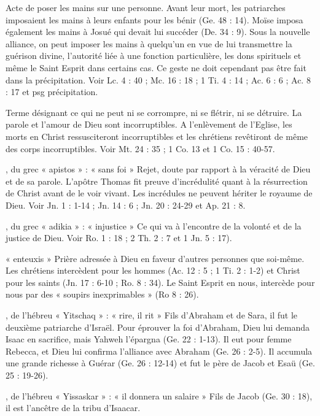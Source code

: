 \begin{multicols}{2}
Acte de poser les mains sur une personne. Avant leur mort, les patriarches imposaient les mains à leurs enfants pour les bénir (Ge. 48 : 14). Moïse imposa également les mains à Josué qui devait lui succéder (De. 34 : 9). Sous la nouvelle alliance, on peut imposer les mains à quelqu’un en vue de lui transmettre la guérison divine, l’autorité liée à une fonction particulière, les dons spirituels et même le Saint Esprit dans certains cas. Ce geste ne doit cependant pas être fait dans la précipitation. Voir Lc. 4 : 40 ; Mc. 16 : 18 ; 1 Ti. 4 : 14 ; Ac. 6 : 6 ; Ac. 8 : 17 et psg précipitation.

Terme désignant ce qui ne peut ni se corrompre, ni se flétrir, ni se détruire. La parole et l’amour de Dieu sont incorruptibles. A l'enlèvement de l'Eglise, les morts en Christ ressusciteront incorruptibles et les chrétiens revêtiront de même des corps incorruptibles. Voir Mt. 24 : 35 ; 1 Co. 13 et 1 Co. 15 : 40-57.


, du grec « apistos » : « sans foi »
Rejet, doute par rapport à la véracité de Dieu et de sa parole. L'apôtre Thomas fit preuve d’incrédulité quant à la résurrection de Christ avant de le voir vivant. Les incrédules ne peuvent hériter le royaume de Dieu. Voir Jn. 1 : 1-14 ; Jn. 14 : 6 ; Jn. 20 : 24-29 et Ap. 21 : 8.


, du grec « adikia » : « injustice »
Ce qui va à l'encontre de la volonté et de la justice de Dieu. Voir Ro. 1 : 18 ; 2 Th. 2 : 7 et 1 Jn. 5 : 17).


« enteuxis »
Prière adressée à Dieu en faveur d'autres personnes que soi-même. Les chrétiens intercèdent pour les hommes (Ac. 12 : 5 ; 1 Ti. 2 : 1-2) et Christ pour les saints (Jn. 17 : 6-10 ; Ro. 8 : 34). Le Saint Esprit en nous, intercède pour nous par des « soupirs inexprimables » (Ro 8 : 26).


, de l'hébreu « Yitschaq » : « rire, il rit »
Fils d'Abraham et de Sara, il fut le deuxième patriarche d'Israël.
Pour éprouver la foi d'Abraham, Dieu lui demanda Isaac en sacrifice, mais Yahweh l'épargna (Ge. 22 : 1-13). Il eut pour femme Rebecca, et Dieu lui confirma l'alliance avec Abraham (Ge. 26 : 2-5). Il accumula une grande richesse à Guérar (Ge. 26 : 12-14) et fut le père de Jacob et Esaü (Ge. 25 : 19-26).


, de l'hébreu « Yissaskar » : « il donnera un salaire »
Fils de Jacob (Ge. 30 : 18), il est l'ancêtre de la tribu d'Isaacar.



\end{multicols}
